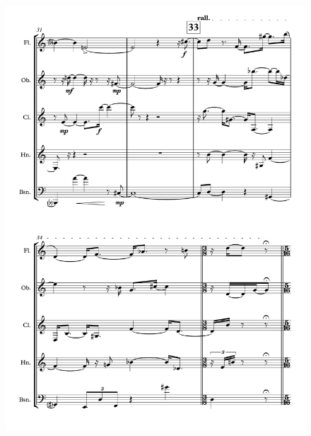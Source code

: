 \begin{figure}[H]
    \centering
	\includegraphics[width=6.5in]{figures/Out_of_Focus_6.pdf}
\end{figure}


